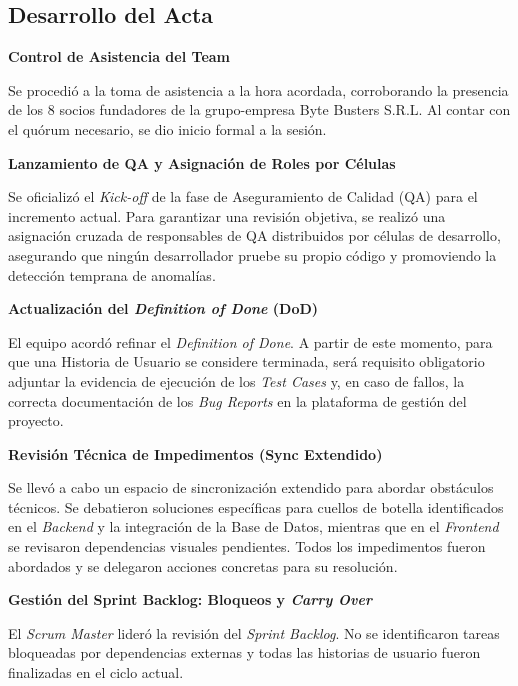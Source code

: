 \newpage
\subsection{Desarrollo del Acta}

\noindent \textbf{Control de Asistencia del Team}\par
Se procedió a la toma de asistencia a la hora acordada, corroborando la presencia de los 8 socios fundadores de la grupo-empresa Byte Busters S.R.L. Al contar con el quórum necesario, se dio inicio formal a la sesión.

\vspace*{0.5cm}
\noindent \textbf{Lanzamiento de QA y Asignación de Roles por Células}\par
Se oficializó el \textit{Kick-off} de la fase de Aseguramiento de Calidad (QA) para el incremento actual. Para garantizar una revisión objetiva, se realizó una asignación cruzada de responsables de QA distribuidos por células de desarrollo, asegurando que ningún desarrollador pruebe su propio código y promoviendo la detección temprana de anomalías.

\vspace*{0.5cm}
\noindent \textbf{Actualización del \textit{Definition of Done} (DoD)}\par
El equipo acordó refinar el \textit{Definition of Done}. A partir de este momento, para que una Historia de Usuario se considere terminada, será requisito obligatorio adjuntar la evidencia de ejecución de los \textit{Test Cases} y, en caso de fallos, la correcta documentación de los \textit{Bug Reports} en la plataforma de gestión del proyecto.

\vspace*{0.5cm}
\noindent \textbf{Revisión Técnica de Impedimentos (Sync Extendido)}\par
Se llevó a cabo un espacio de sincronización extendido para abordar obstáculos técnicos. Se debatieron soluciones específicas para cuellos de botella identificados en el \textit{Backend} y la integración de la Base de Datos, mientras que en el \textit{Frontend} se revisaron dependencias visuales pendientes. Todos los impedimentos fueron abordados y se delegaron acciones concretas para su resolución.

\vspace*{0.5cm}
\noindent \textbf{Gestión del Sprint Backlog: Bloqueos y \textit{Carry Over}}\par
El \textit{Scrum Master} lideró la revisión del \textit{Sprint Backlog}. No se identificaron tareas bloqueadas por dependencias externas y todas las historias de usuario fueron finalizadas en el ciclo actual.

